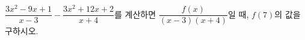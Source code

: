 $\dfrac{3x^2-9x+1}{x-3}-\dfrac{3x^2+12x+2}{x+4}$를 계산하면 $\dfrac{f(x)}{(x-3)(x+4)}$일 때, $f(7)$의 값을 구하시오.
